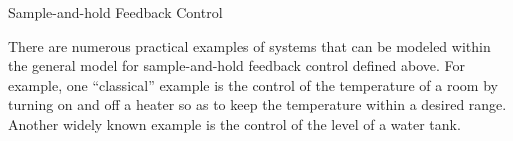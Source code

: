 \begin{example}{Sample-and-hold Feedback Control}
\begin{itemize}

\end{itemize}

There are numerous practical examples of systems that can be modeled 
within the general model for sample-and-hold feedback control defined above.
For example, one ``classical'' example is the control of the temperature of a room 
by turning on and off a heater so as to keep the temperature within a desired range.
Another widely known example is the control of the level of a water tank.

\end{example}
